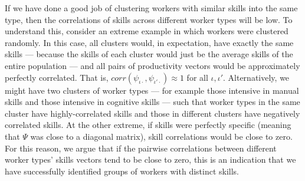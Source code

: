 \documentclass[12pt]{article}
\def\i{\iota}
\theoremstyle{definition}
\theoremstyle{plain}
\begin{document}
If we have done a good job of clustering workers with similar skills into the same type, then the correlations of skills across different worker types will be low. To understand this, consider an extreme example in which workers were clustered randomly. In this case, all clusters would, in expectation, have exactly the same skills --- because the skills of each cluster would just be the average skills of the entire population --- and all pairs of productivity vectors would be approximately perfectly correlated. That is, $corr(\psi_{\i\cdot},\psi_{\i'\cdot}) \approx 1$ for all $\i,\i'$.  Alternatively, we might have two clusters of worker types --- for example those intensive in manual skills and those intensive in cognitive skills --- such that worker types in the same cluster have highly-correlated skills and those in different clusters have  negatively correlated skills. At the other extreme, if skills were perfectly specific (meaning that $\Psi$ was close to a diagonal matrix), skill correlations would be close to zero. For this reason, we argue that if the pairwise correlations between different worker types’ skills vectors tend to be close to zero, this is an indication that we have successfully identified groups of workers with distinct skills. 

\end{document}
